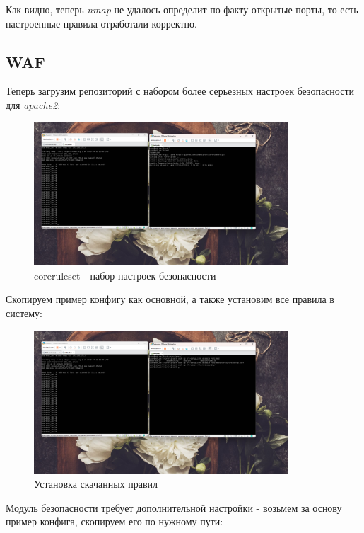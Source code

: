 \documentclass[a4paper]{article}
\begin{document}
  Как видно, теперь \textit{nmap} не удалось определит по факту открытые порты, то
  есть настроенные правила отработали корректно.

  \subsection{WAF}

  Теперь загрузим репозиторий с набором более серьезных настроек безопасности для \textit{apache2}:

  \begin{figure}[H]
    \centering
    \includegraphics[width=0.85\textwidth]{03_00 (54)}
    \caption{coreruleset - набор настроек безопасности}
    \label{img:54}
  \end{figure}

  Скопируем пример конфигу как основной, а также установим все правила в систему:

  \begin{figure}[H]
    \centering
    \includegraphics[width=0.85\textwidth]{03_00 (55)}
    \caption{Установка скачанных правил}
    \label{img:55}
  \end{figure}

  Модуль безопасности требует дополнительной настройки - возьмем за основу
  пример конфига, скопируем его по нужному пути:
\end{document}

